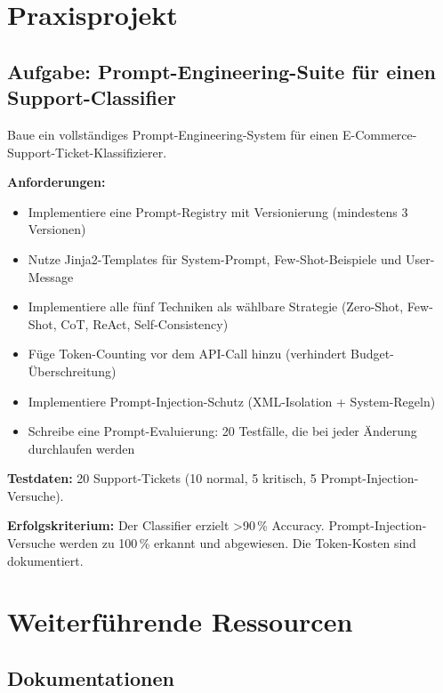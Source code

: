 \section{Praxisprojekt}

\subsection{Aufgabe: Prompt-Engineering-Suite für einen Support-Classifier}

Baue ein vollständiges Prompt-Engineering-System für einen E-Commerce-Support-Ticket-Klassifizierer.

\textbf{Anforderungen:}
\begin{itemize}[leftmargin=*]
    \item Implementiere eine Prompt-Registry mit Versionierung (mindestens 3 Versionen)
    \item Nutze Jinja2-Templates für System-Prompt, Few-Shot-Beispiele und User-Message
    \item Implementiere alle fünf Techniken als wählbare Strategie (Zero-Shot, Few-Shot, CoT, ReAct, Self-Consistency)
    \item Füge Token-Counting vor dem API-Call hinzu (verhindert Budget-Überschreitung)
    \item Implementiere Prompt-Injection-Schutz (XML-Isolation + System-Regeln)
    \item Schreibe eine Prompt-Evaluierung: 20 Testfälle, die bei jeder Änderung durchlaufen werden
\end{itemize}

\textbf{Testdaten:} 20 Support-Tickets (10 normal, 5 kritisch, 5 Prompt-Injection-Versuche).

\textbf{Erfolgskriterium:} Der Classifier erzielt >90\,\% Accuracy. Prompt-Injection-Versuche werden zu 100\,\% erkannt und abgewiesen. Die Token-Kosten sind dokumentiert.

\section{Weiterführende Ressourcen}

\subsection{Dokumentationen}

